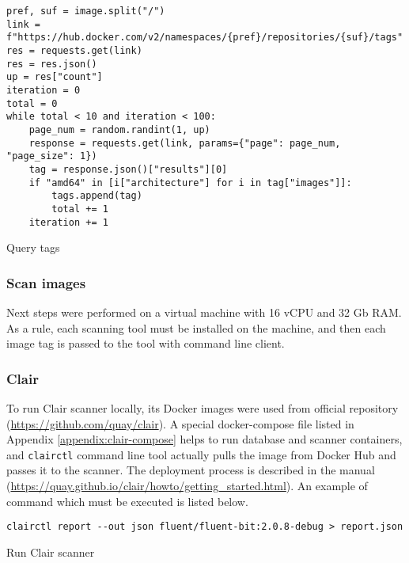 \begin{listing}[htp]
    \centering
    \begin{minipage}{1\linewidth}
        \begin{verbatim}
pref, suf = image.split("/")
link = f"https://hub.docker.com/v2/namespaces/{pref}/repositories/{suf}/tags"
res = requests.get(link)
res = res.json()
up = res["count"]
iteration = 0
total = 0
while total < 10 and iteration < 100:
    page_num = random.randint(1, up)
    response = requests.get(link, params={"page": page_num, "page_size": 1})
    tag = response.json()["results"][0]
    if "amd64" in [i["architecture"] for i in tag["images"]]:
        tags.append(tag)
        total += 1
    iteration += 1
        \end{verbatim}
    \end{minipage}
    \caption{Query tags}
    \label{lst:tags}
\end{listing}

\subsubsection{Scan images}

Next steps were performed on a virtual machine with 16 vCPU and 32 Gb RAM. As a rule, each scanning tool must be installed on the machine, and then each image tag is passed to the tool with command line client.

\subsubsection*{Clair}

To run Clair scanner locally, its Docker images were used from official repository (\url{https://github.com/quay/clair}). A special docker-compose file listed in Appendix \ref{appendix:clair-compose} helps to run database and scanner containers, and \texttt{clairctl} command line tool actually pulls the image from Docker Hub and passes it to the scanner. The deployment process is described in the manual (\url{https://quay.github.io/clair/howto/getting_started.html}). An example of command which must be executed is listed below. 

\begin{listing}[htp]
    \centering
    \begin{minipage}{0.9\linewidth}
        \begin{verbatim}
clairctl report --out json fluent/fluent-bit:2.0.8-debug > report.json
        \end{verbatim}
    \end{minipage}
    \caption{Run Clair scanner}
    \label{lst:clair}
\end{listing}


